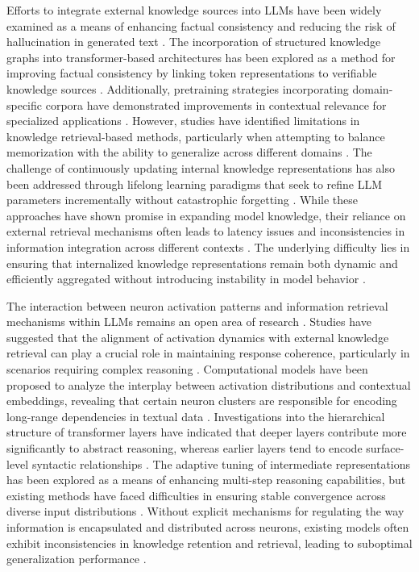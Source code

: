 \documentclass{article}
\begin{document}
Efforts to integrate external knowledge sources into LLMs have been widely examined as a means of enhancing factual consistency and reducing the risk of hallucination in generated text \cite{aguiluz2024dynamic}. The incorporation of structured knowledge graphs into transformer-based architectures has been explored as a method for improving factual consistency by linking token representations to verifiable knowledge sources \cite{fa2024modality}. Additionally, pretraining strategies incorporating domain-specific corpora have demonstrated improvements in contextual relevance for specialized applications \cite{lu2024large}. However, studies have identified limitations in knowledge retrieval-based methods, particularly when attempting to balance memorization with the ability to generalize across different domains \cite{mcintosh2024game}. The challenge of continuously updating internal knowledge representations has also been addressed through lifelong learning paradigms that seek to refine LLM parameters incrementally without catastrophic forgetting \cite{tarel2024transformative}. While these approaches have shown promise in expanding model knowledge, their reliance on external retrieval mechanisms often leads to latency issues and inconsistencies in information integration across different contexts \cite{atox2024evaluating}. The underlying difficulty lies in ensuring that internalized knowledge representations remain both dynamic and efficiently aggregated without introducing instability in model behavior \cite{foster2024token}. 

The interaction between neuron activation patterns and information retrieval mechanisms within LLMs remains an open area of research \cite{chard2024auditing}. Studies have suggested that the alignment of activation dynamics with external knowledge retrieval can play a crucial role in maintaining response coherence, particularly in scenarios requiring complex reasoning \cite{hisaharo2024optimizing}. Computational models have been proposed to analyze the interplay between activation distributions and contextual embeddings, revealing that certain neuron clusters are responsible for encoding long-range dependencies in textual data \cite{eamen2024neural}. Investigations into the hierarchical structure of transformer layers have indicated that deeper layers contribute more significantly to abstract reasoning, whereas earlier layers tend to encode surface-level syntactic relationships \cite{ vitiello2024context}. The adaptive tuning of intermediate representations has been explored as a means of enhancing multi-step reasoning capabilities, but existing methods have faced difficulties in ensuring stable convergence across diverse input distributions \cite{kanax2024contextualized, navjord2023beyond}. Without explicit mechanisms for regulating the way information is encapsulated and distributed across neurons, existing models often exhibit inconsistencies in knowledge retention and retrieval, leading to suboptimal generalization performance \cite{wench2024factored}. 
\end{document}
